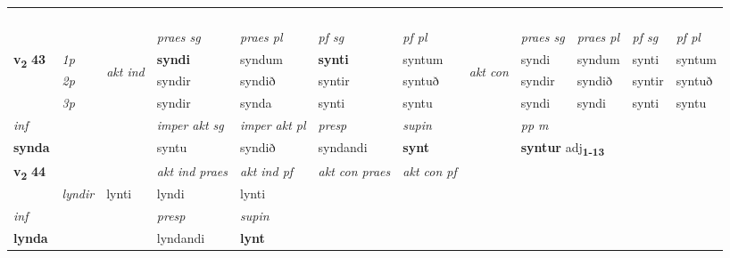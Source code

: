 \begin{longtable}[l]{X>{\footnotesize\itshape}llXXXXlXXXX}
\midrule
& \\*
  & \\*
   & \\*
  & \\
   \midrule
 & &   & \textit{praes sg}  & \textit{praes pl}    & \textit{ pf sg} & \textit{pf pl} & & \textit{praes sg}  & \textit{praes pl}    & \textit{pf sg} & \textit{pf pl }  \\ \cmidrule{4-7} \cmidrule{9-12}
 \multirow{2}{*}{{{\textbf{v{\textsubscript{2}}} \Large{\textbf{43}}}}}  & 1p & \multirow{3}{*}{\begin{turn}{90}\textit{akt ind}\end{turn}} & \textbf{syndi} & syndum & \textbf{synti} & syntum & \multirow{3}{*}{\begin{turn}{90}\textit{akt con}\end{turn}} &syndi & syndum & synti & syntum\\*
 & 2p &  &  syndir  & syndið & syntir & syntuð & & syndir & syndið & syntir & syntuð \\*
 & 3p &  & syndir & synda & synti & syntu & & syndi & syndi& synti & syntu \\*
\cmidrule{4-7} \cmidrule{9-12}

   {\textit{inf}} & &  & \textit{imper akt sg} & \textit{imper akt pl}   & \textit{presp} & \textit{supin}  && \textit{pp m} \\*
  {\textbf{synda}} & && syntu  & syndið   & syndandi &  \textbf{synt}  && \multicolumn{2}{l}{\textbf{syntur} adj\textbf{\textsubscript{1-13}}} \\*

\midrule

\multirow{2}{*}{{{\textbf{v{\textsubscript{2}}} \Large{\textbf{44}}}}}  &&&  \textit{akt ind praes} & \textit{akt ind pf} & \textit{akt con praes} & \textit{akt con pf} \\*
\multicolumn{3}{r}{\textit{e-m}} & lyndir & lynti & lyndi & lynti \\*

\cmidrule{4-7}
   {\textit{inf}} & &     & \textit{presp} & \textit{supin}   \\*
  {\textbf{lynda}} & &     & lyndandi &  \textbf{lynt}   \\*

\midrule


\end{longtable}
